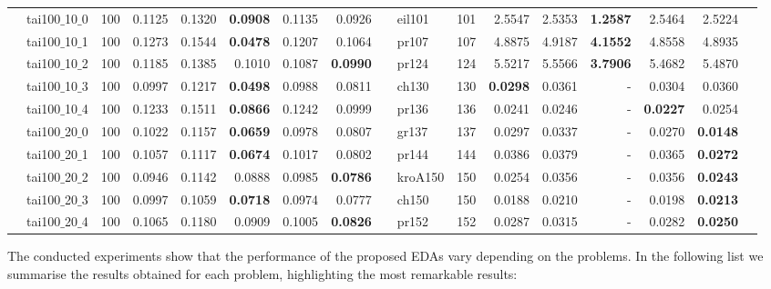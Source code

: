 \documentclass[conference]{IEEEtran}
\begin{document}
\begin{table}[hbt]
{\begin{tabular}{clrrrrrr | clrrrrrrr}
 & tai100$\_$10$\_$0 & 100 & 0.1125 & 0.1320 & {\bf 0.0908} & 0.1135 & 0.0926 &  & eil101 & 101 & 2.5547 & 2.5353 & {\bf 1.2587} & 2.5464 & 2.5224\\
 & tai100$\_$10$\_$1 & 100 & 0.1273 & 0.1544 & {\bf 0.0478} & 0.1207 & 0.1064 &  & pr107 & 107 & 4.8875 & 4.9187 & {\bf 4.1552} & 4.8558 & 4.8935\\
 & tai100$\_$10$\_$2 & 100 & 0.1185 & 0.1385 & 0.1010 & 0.1087 & {\bf 0.0990} &  & pr124 & 124 & 5.5217 & 5.5566 & {\bf 3.7906} & 5.4682 & 5.4870\\
 & tai100$\_$10$\_$3 & 100 & 0.0997 & 0.1217 & {\bf 0.0498} & 0.0988 & 0.0811 &  & ch130 & 130 & {\bf 0.0298} & 0.0361 & - & 0.0304 & 0.0360\\
 & tai100$\_$10$\_$4 & 100 & 0.1233 & 0.1511 & {\bf 0.0866} & 0.1242 & 0.0999 &  & pr136 & 136 & 0.0241 & 0.0246 & - & {\bf 0.0227} & 0.0254\\
 & tai100$\_$20$\_$0 & 100 & 0.1022 & 0.1157 & {\bf 0.0659} & 0.0978 & 0.0807 &  & gr137 & 137 & 0.0297 & 0.0337 & - & 0.0270 & {\bf 0.0148}\\
 & tai100$\_$20$\_$1 & 100 & 0.1057 & 0.1117 & {\bf 0.0674} & 0.1017 & 0.0802 &  & pr144 & 144 & 0.0386 & 0.0379 & - & 0.0365 & {\bf 0.0272}\\
 & tai100$\_$20$\_$2 & 100 & 0.0946 & 0.1142 & 0.0888 & 0.0985 & {\bf 0.0786} &  & kroA150 & 150 & 0.0254 & 0.0356 & - & 0.0356 & {\bf 0.0243}\\
 & tai100$\_$20$\_$3 & 100 & 0.0997 & 0.1059 & {\bf 0.0718} & 0.0974 & 0.0777 &  & ch150 & 150 & 0.0188 & 0.0210 & - & 0.0198 & {\bf 0.0213}\\
 & tai100$\_$20$\_$4 & 100 & 0.1065 & 0.1180 & 0.0909 & 0.1005 & {\bf 0.0826} &  & pr152 & 152 & 0.0287 & 0.0315 & - & 0.0282 & {\bf 0.0250}\\
  \end{tabular}
  }
\label{table1}
\end{table}

The conducted experiments show that the performance of the proposed EDAs vary depending on the problems. In the following list we summarise the results obtained for each problem, highlighting the most remarkable results:
\end{document}
